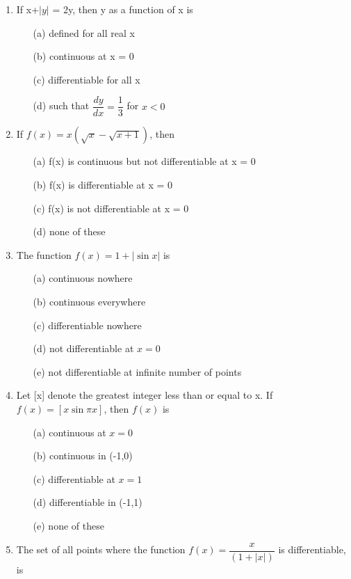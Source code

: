 \documentclass[journal,12pt,twocolumn]{IEEEtran}
\begin{document}
\begin{enumerate}
\item If x+$|y|$ = 2y, then y as a function of x is
\begin{itemize}
\item[(a)] defined for all real x
\item[(b)] continuous at x = 0
\item[(c)] differentiable for all x
\item[(d)] such that $\dfrac{dy}{dx}=\dfrac{1}{3}$ for $x<0$\\
\end{itemize}

\item If $f(x)=x(\sqrt{x}-\sqrt{x+1})$, then
\begin{itemize}
\item[(a)] f(x) is continuous but not differentiable at x = 0
\item[(b)] f(x) is differentiable at x = 0
\item[(c)] f(x) is not differentiable at x = 0
\item[(d)] none of these
\end{itemize}

\item The function $f(x)=1+|\sin x|$ is
\begin{itemize}
\item[(a)] continuous nowhere
\item[(b)] continuous everywhere
\item[(c)] differentiable nowhere
\item[(d)] not differentiable at $x=0$
\item[(e)] not differentiable at infinite number of points
\end{itemize}

\item Let [x] denote the greatest integer less than or equal to x. If $f(x)=[x \sin\pi x]$, then $f(x)$ is
\begin{itemize}
\item[(a)] continuous at $x=0$ \item[(b)] continuous in (-1,0) \item[(c)] differentiable at $x=1$ \item[(d)] differentiable in (-1,1) \item[(e)] none of these
\end{itemize}

\item The set of all points where the function $f(x)=\dfrac{x}{(1+|x|)}$ is differentiable, is
\begin{itemize}
\begin{multicols}{2}
\item[(a)] $(-\infty,\infty)$ \item[(c)] $(-\infty,0)\cup(0,\infty)$ \item[(e)] None \item[(b)] $[0,\infty)$ \item[(d)] $(0,\infty)$
\end{multicols}
\end{itemize}


\end{enumerate}
\end{document}
